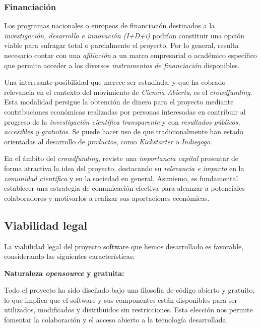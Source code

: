 \subsubsection{Financiación}

Los programas nacionales o europeos de financiación destinados a la \textit{investigación, desarrollo e innovación (I+D+i)} 
podrían constituir una opción viable para sufragar total o parcialmente el proyecto. Por lo general, resulta necesario contar 
con una \textit{afiliación} a un marco empresarial o académico específico que permita acceder a los 
diversos \textit{instrumentos de financiación} disponibles.

Una interesante posibilidad que merece ser estudiada, y que ha cobrado relevancia en el contexto del movimiento 
de \textit{Ciencia Abierta}, es el \textit{crowdfunding}. Esta modalidad persigue la obtención de dinero  
para el proyecto mediante contribuciones económicas realizadas por personas interesadas en contribuir al progreso 
de la \textit{investigación científica transparente} y con \textit{resultados públicos, accesibles y gratuitos}. Se puede 
hacer uso de que tradicionalmente han estado orientadas al desarrollo de \textit{productos}, como \textit{Kickstarter} o \textit{Indiegogo}.

En el ámbito del \textit{crowdfunding}, reviste una \textit{importancia capital} presentar de forma atractiva 
la idea del proyecto, destacando su \textit{relevancia e impacto} en la \textit{comunidad científica} y en 
la sociedad en general. Asimismo, es fundamental establecer una estrategia de comunicación efectiva 
para alcanzar a potenciales colaboradores y motivarlos a realizar sus aportaciones económicas.


\subsection{Viabilidad legal}

La viabilidad legal del proyecto software que hemos desarrollado es favorable, considerando las siguientes características:

\textbf{Naturaleza \textit{opensource} y gratuita:} 

Todo el proyecto ha sido diseñado bajo una filosofía de código abierto y gratuito, 
lo que implica que el software y sus componentes están disponibles para ser utilizados, modificados y distribuidos sin 
restricciones. Esta elección nos permite fomentar la colaboración y el acceso abierto a la tecnología desarrollada.

